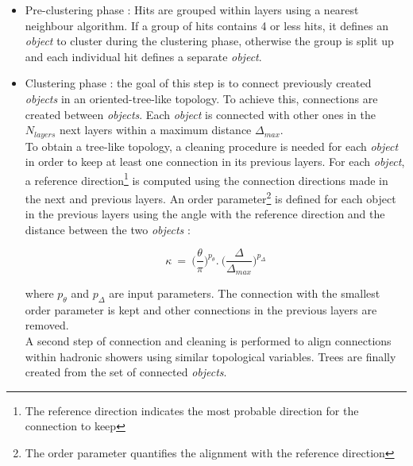 \documentclass[cits]{JINST}
\begin{document}
\begin{itemize}
  \item[\textbullet] Pre-clustering phase : Hits are grouped within layers using a nearest neighbour algorithm. If a group of hits contains 4 or less hits, it defines an \emph{object} to cluster during the clustering phase, otherwise the group is split up and each individual hit defines a separate \emph{object}. 
  
  \item[\textbullet] Clustering phase : the goal of this step is to connect previously created \emph{objects} in an oriented-tree-like topology. To achieve this, connections are created between \emph{objects}. Each \emph{object} is connected with other ones in the $N_{layers}$ next layers within a maximum distance $\Delta_{max}$. \\
  To obtain a tree-like topology, a cleaning procedure is needed for each \emph{object} in order to keep at least one connection in its previous layers. For each \emph{object}, a reference direction\footnote{The reference direction indicates the most probable direction for the connection to keep} is computed using the connection directions made in the next and previous layers. An order parameter\footnote{The order parameter quantifies the alignment with the reference direction} is defined for each object in the previous layers using the angle with the reference direction and the distance between the two \emph{objects} :
  
  \begin{equation}
  \kappa~=~\Big(\frac{\theta}{\pi}\Big)^{p_{\theta}} . ~\Big(\frac{\Delta}{\Delta_{max}}\Big)^{p_{\Delta}} 
  \end{equation}

  where $p_{\theta}$ and $p_{\Delta}$ are input parameters. The connection with the smallest order parameter is kept and other connections in the previous layers are removed. \\
  A second step of connection and cleaning is performed to align connections within hadronic showers using similar topological variables. Trees are finally created from the set of connected \emph{objects}.
  

\end{itemize}
\end{document}
